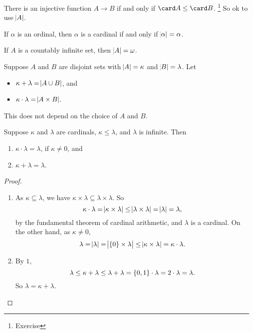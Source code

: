 \begin{remark*}
There is an injective function $ A \to B $ if and only if $ \card A \le \card B $. \footnote{Exercise} So ok to use $ \abs{A} $.
\end{remark*}

If $ \alpha $ is an ordinal, then $ \alpha $ is a cardinal if and only if $ \abs{\alpha} = \alpha $.

\begin{example*}
If $ A $ is a countably infinite set, then $ \abs{A} = \omega $.
\end{example*}

\begin{definition}
Suppose $ A $ and $ B $ are disjoint sets with $ \abs{A} = \kappa $ and $ \abs{B} = \lambda $. Let
\begin{itemize}
\item $ \kappa + \lambda = \abs{A \cup B} $, and
\item $ \kappa \cdot \lambda = \abs{A \times B} $.
\end{itemize}
\end{definition}

\begin{remark*}
This does not depend on the choice of $ A $ and $ B $.
\end{remark*}

\begin{theorem}
\label{thm:4.2.5}
Suppose $ \kappa $ and $ \lambda $ are cardinals, $ \kappa \le \lambda $, and $ \lambda $ is infinite. Then
\begin{enumerate}
\item $ \kappa \cdot \lambda = \lambda $, if $ \kappa \ne 0 $, and
\item $ \kappa + \lambda = \lambda $.
\end{enumerate}
\end{theorem}

\begin{proof}
\hfill
\begin{enumerate}
\item As $ \kappa \subseteq \lambda $, we have $ \kappa \times \lambda \subseteq \lambda \times \lambda $. So
$$ \kappa \cdot \lambda = \abs{\kappa \times \lambda} \le \abs{\lambda \times \lambda} = \abs{\lambda} = \lambda, $$
by the fundamental theorem of cardinal arithmetic, and $ \lambda $ is a cardinal. On the other hand, as $ \kappa \ne 0 $,
$$ \lambda = \abs{\lambda} = \abs{\cbr{0} \times \lambda} \le \abs{\kappa \times \lambda} = \kappa \cdot \lambda. $$
\item By $ 1 $,
$$ \lambda \le \kappa + \lambda \le \lambda + \lambda = \cbr{0, 1} \cdot \lambda = 2 \cdot \lambda = \lambda. $$
So $ \lambda = \kappa + \lambda $.
\end{enumerate}
\end{proof}

